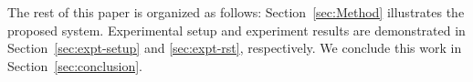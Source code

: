 The rest of this paper is organized as follows: Section~\ref{sec:Method} illustrates the proposed system. Experimental setup and experiment results are demonstrated in Section~\ref{sec:expt-setup} and \ref{sec:expt-rst}, respectively. We conclude this work in Section~\ref{sec:conclusion}.

